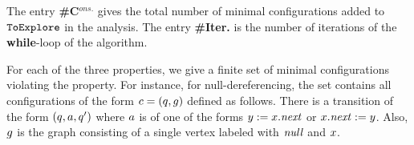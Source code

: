 %
\noindent
%
The entry {\bf \#C$^{ons.}$} gives the total number of minimal configurations added to ${\tt ToExplore}$ in the analysis. The entry {\bf \#Iter.} is the number of iterations of the \textbf{while}-loop of the algorithm.
%

\noindent
For each of the three properties, we give a finite set of minimal configurations violating the property.
%
For instance, for null-dereferencing, the set contains all 
configurations of the form $c=\left(q,g\right)$
defined as follows.
%
There is a transition of the form $\left(q,a,q'\right)$
where $a$ is of one of the forms $y:=x.{\it next}$ or $x.{\it next}:=y$.
%
Also, $g$ is the graph consisting of a single vertex labeled with ${\it null}$ and $x$.
%
